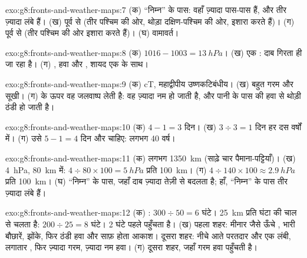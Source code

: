 \begin{solution}{exo:g8:fronts-and-weather-maps:7}
(क) ``निम्न'' के पास: वहाँ  ज़्यादा पास-पास हैं, और तीर ज़्यादा लंबे हैं।
(ख) पूर्व से (तीर पश्चिम की ओर, थोड़ा दक्षिण-पश्चिम की ओर, इशारा करते हैं)।
(ग) पूर्व से (तीर पश्चिम की ओर इशारा करते हैं)। (घ)
वामावर्त।
\end{solution}

\begin{solution}{exo:g8:fronts-and-weather-maps:8}
(क) $1016 - 1003 = \qty{13}{hPa}$। (ख) एक : दाब गिरता ही जा रहा है।
(ग) , हवा और , शायद एक  के साथ।
\end{solution}

\begin{solution}{exo:g8:fronts-and-weather-maps:9}
(क) cT, महाद्वीपीय उष्णकटिबंधीय। (ख) बहुत गरम और सूखी। (ग)  के ऊपर वह जलवाष्प
लेती है: वह ज़्यादा नम हो जाती है, और पानी के पास की हवा  से थोड़ी ठंडी हो जाती
है।
\end{solution}

\begin{solution}{exo:g8:fronts-and-weather-maps:10}
(क) $4 - 1 = 3$ दिन। (ख) $3 \div 3 = 1$ दिन हर दस वर्षों में। (ग) उसे
$5 - 1 = 4$ दिन और चाहिए: लगभग 40 वर्ष।
\end{solution}

\begin{solution}{exo:g8:fronts-and-weather-maps:11}
(क) लगभग \qty{1350}{km} (साढ़े चार पैमाना-पट्टियाँ)। (ख) \qty{4}{hPa},
\qty{80}{km} में: $4 \div 80 \times 100 = \qty{5}{hPa}$ प्रति \qty{100}{km}।
(ग) $4 \div 140 \times 100 \approx \qty{2.9}{hPa}$ प्रति \qty{100}{km}।
(घ) ``निम्न'' के पास, जहाँ दाब ज़्यादा तेज़ी से बदलता है; हाँ, ``निम्न'' के पास तीर
ज़्यादा लंबे हैं।
\end{solution}

\begin{solution}{exo:g8:fronts-and-weather-maps:12}
(क) : $300 \div 50 = 6$ घंटे।  \qty{25}{km} प्रति घंटा की चाल
से चलता है: $200 \div 25 = 8$ घंटे।  2 घंटे पहले पहुँचता है। (ख) पहला
शहर: मीनार जैसे ऊँचे , भारी बौछारें, झोंके, फिर ठंडी हवा और साफ़ होता आकाश। दूसरा
शहर: नीचे आते परतदार  और एक लंबी, लगातार , फिर ज़्यादा गरम, ज़्यादा नम हवा।
(ग) दूसरा शहर, जहाँ गरम हवा पहुँचती है।
\end{solution}

